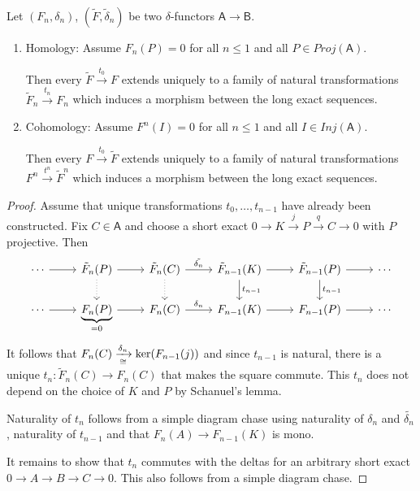 \documentclass[fontsize=11pt,fleqn,a4paper]{scrartcl}
\begin{document}
\begin{lemma}
Let $(F_n,\delta_n)$, $(\tilde{F},\tilde{\delta}_n)$ be two $\delta$-functors $\mathsf{A}\to\mathsf{B}$.
\begin{multicols}{2}
\begin{enumerate}
\item Homology: Assume $F_n(P) = 0$ for all $n\leq 1$ and all $P\in Proj(\mathsf{A})$.

Then every $\tilde{F} \xrightarrow{t_0} F$ extends uniquely to a family of natural transformations $\tilde{F}_n \xrightarrow{t_n} F_n$ which induces a morphism between the long exact sequences.
\item Cohomology: Assume $F^n(I) = 0$ for all $n\leq 1$ and all $I\in Inj(\mathsf{A})$.

Then every $F\xrightarrow{t_0}\tilde{F}$ extends uniquely to a family of natural transformations $F^n \xrightarrow{t^n} \tilde{F}^n$ which induces a morphism between the long exact sequences.
\end{enumerate}
\end{multicols}
\end{lemma}
\begin{proof}
Assume that unique transformations $t_0,\ldots,t_{n-1}$ have already been constructed. Fix $C\in\mathsf{A}$ and choose a short exact $0\to K\xrightarrow{j} P \xrightarrow{q} C\to 0$ with $P$ projective. Then
\[\begin{tikzcd}
\cdots \ar[r] & \tilde{F}_n(P) \ar[r]\ar[d,dotted]  & \tilde{F}_n(C) \ar[r,"\tilde{\delta_n}"]\ar[d,dotted]  & \tilde{F}_{n-1}(K) \ar[r]\ar[d,"t_{n-1}"]  & \tilde{F}_{n-1}(P)\ar[d,"t_{n-1}"] \ar[r] & \cdots \\
\cdots \ar[r] & \underbrace{F_n(P)}_{=0} \ar[r] & F_n(C) \ar[r,"\delta_n"] & F_{n-1}(K) \ar[r] & F_{n-1}(P) \ar[r] & \cdots 
\end{tikzcd}\]
It follows that $F_n(C) \xrightarrow[\cong]{\delta_n} \ker(F_{n-1}(j))$ and since $t_{n-1}$ is natural, there is a unique $t_n: \tilde{F}_n(C) \to F_n(C)$ that makes the square commute. This $t_n$ does not depend on the choice of $K$ and $P$ by Schanuel's lemma.

Naturality of $t_n$ follows from a simple diagram chase using naturality of $\delta_n$ and $\tilde{\delta_n}$, naturality of $t_{n-1}$ and that $F_n(A) \to F_{n-1}(K)$ is mono.

It remains to show that $t_n$ commutes with the deltas for an arbitrary short exact $0\to A\to B\to C\to 0$. This also follows from a simple diagram chase.
\end{proof}
\end{document}
